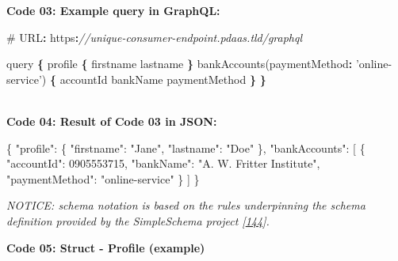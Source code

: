 \documentclass[12pt,english,a4paper,titlepage,cleardoublepage=empty,dottedtoc]{report}
\newenvironment{Shaded}{\begin{snugshade}}{\end{snugshade}}
\newcommand{\DataTypeTok}[1]{\textcolor[rgb]{0.13,0.29,0.53}{{#1}}}
\newcommand{\DecValTok}[1]{\textcolor[rgb]{0.00,0.00,0.81}{{#1}}}
\newcommand{\StringTok}[1]{\textcolor[rgb]{0.31,0.60,0.02}{{#1}}}
\newcommand{\CommentTok}[1]{\textcolor[rgb]{0.56,0.35,0.01}{\textit{{#1}}}}
\newcommand{\OtherTok}[1]{\textcolor[rgb]{0.56,0.35,0.01}{{#1}}}
\newcommand{\FunctionTok}[1]{\textcolor[rgb]{0.00,0.00,0.00}{{#1}}}
\newcommand{\OperatorTok}[1]{\textcolor[rgb]{0.81,0.36,0.00}{\textbf{{#1}}}}
\newcommand{\AttributeTok}[1]{\textcolor[rgb]{0.77,0.63,0.00}{{#1}}}
\newcommand{\NormalTok}[1]{{#1}}
\begin{document}
\newpage

\textbf{\protect\hypertarget{code-03_graphql-query}{}{Code 03: Example
query in GraphQL}:}

\begin{Shaded}
\begin{Highlighting}[numbers=left,,]
\NormalTok{# URL}\OperatorTok{:} \NormalTok{https}\OperatorTok{:}\CommentTok{//unique-consumer-endpoint.pdaas.tld/graphql}

\NormalTok{query }\OperatorTok{\{}
    \NormalTok{profile }\OperatorTok{\{}
        \NormalTok{firstname}
        \NormalTok{lastname}
    \OperatorTok{\}}
    \AttributeTok{bankAccounts}\NormalTok{(}\DataTypeTok{paymentMethod}\OperatorTok{:} \StringTok{'online-service'}\NormalTok{) }\OperatorTok{\{}
        \NormalTok{accountId}
        \NormalTok{bankName}
        \NormalTok{paymentMethod}
    \OperatorTok{\}}
\OperatorTok{\}}
\end{Highlighting}
\end{Shaded}

~\\
\textbf{\protect\hypertarget{code-04_graphql-query-result}{}{Code 04:
Result of Code 03 in JSON}:}

\begin{Shaded}
\begin{Highlighting}[numbers=left,,]
\FunctionTok{\{}
    \DataTypeTok{"profile"}\FunctionTok{:} \FunctionTok{\{}
        \DataTypeTok{"firstname"}\FunctionTok{:} \StringTok{"Jane"}\FunctionTok{,} 
        \DataTypeTok{"lastname"}\FunctionTok{:} \StringTok{"Doe"}
    \FunctionTok{\},}
    \DataTypeTok{"bankAccounts"}\FunctionTok{:} \OtherTok{[}
        \FunctionTok{\{}
            \DataTypeTok{"accountId"}\FunctionTok{:} \DecValTok{0905553715}\FunctionTok{,}
            \DataTypeTok{"bankName"}\FunctionTok{:} \StringTok{"A. W. Fritter Institute"}\FunctionTok{,}
            \DataTypeTok{"paymentMethod"}\FunctionTok{:} \StringTok{"online-service"}
        \FunctionTok{\}}
    \OtherTok{]}
\FunctionTok{\}}
\end{Highlighting}
\end{Shaded}

\newpage

\emph{NOTICE: schema notation is based on the rules underpinning the
schema definition provided by the SimpleSchema project
{[}\protect\hyperlink{ref-web_2017_repo_node-simple-schema}{144}{]}.}

\textbf{\protect\hypertarget{code-05_struct_profile}{}{Code 05: Struct -
Profile (example)}}
\end{document}
